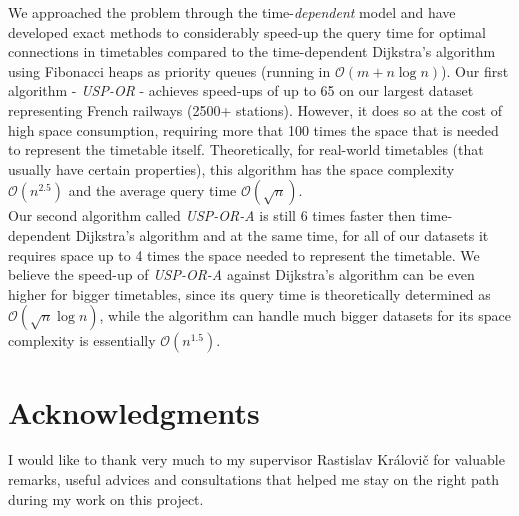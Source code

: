 \documentclass{svk_long_en}
\begin{document}
	We approached the problem through the time-\textit{dependent} model and have developed exact methods to considerably speed-up the query time for optimal connections in timetables compared to the time-dependent Dijkstra's algorithm using Fibonacci heaps as priority queues (running in $\mathcal{O}(m + n \log n)$). Our first algorithm - \textit{USP-OR} - achieves speed-ups of up to 65 on our largest dataset representing French railways (2500+ stations). However, it does so at the cost of high space consumption, requiring more that 100 times the space that is needed to represent the timetable itself. Theoretically, for real-world timetables (that usually have certain properties), this algorithm has the space complexity $\mathcal{O}(n^{2.5})$ and the average query time $\mathcal{O}(\sqrt{n})$. \\
	
	Our second algorithm called \textit{USP-OR-A} is still 6 times faster then time-dependent Dijkstra's algorithm and at the same time, for all of our datasets it requires space up to 4 times the space needed to represent the timetable. We believe the speed-up of \textit{USP-OR-A} against Dijkstra's algorithm can be even higher for bigger timetables, since its query time is theoretically determined as $\mathcal{O}(\sqrt{n} \log n)$, while the algorithm can handle much bigger datasets for its space complexity is essentially $\mathcal{O}(n^{1.5})$. \\

\section*{Acknowledgments}
	I would like to thank very much to my supervisor Rastislav Královič for valuable remarks, useful advices and consultations that helped me stay on the right path during my work on this project.





	\nocite{*}
	
	
\end{document}
